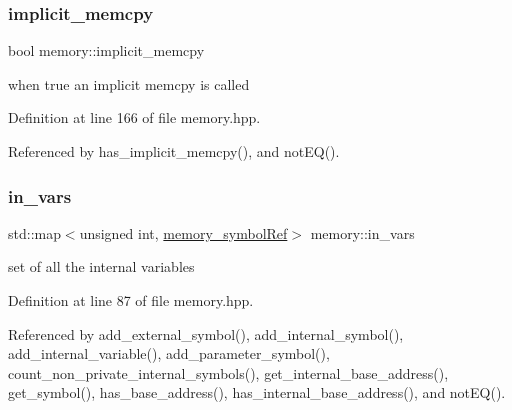 \mbox{\label{classmemory_a86949b9eb85aded9563911074a16f691}} 
\subsubsection{\texorpdfstring{implicit\+\_\+memcpy}{implicit\_memcpy}}
{\footnotesize\ttfamily bool memory\+::implicit\+\_\+memcpy\hspace{0.3cm}{\ttfamily [private]}}



when true an implicit memcpy is called 



Definition at line 166 of file memory.\+hpp.



Referenced by has\+\_\+implicit\+\_\+memcpy(), and not\+E\+Q().

\mbox{\label{classmemory_a7425f19fdc73130bccf232d8deef4006}} 
\subsubsection{\texorpdfstring{in\+\_\+vars}{in\_vars}}
{\footnotesize\ttfamily std\+::map$<$unsigned int, \hyperlink{memory__symbol_8hpp_af3608dbc27177447c2d777fa712cc82a}{memory\+\_\+symbol\+Ref}$>$ memory\+::in\+\_\+vars\hspace{0.3cm}{\ttfamily [private]}}



set of all the internal variables 



Definition at line 87 of file memory.\+hpp.



Referenced by add\+\_\+external\+\_\+symbol(), add\+\_\+internal\+\_\+symbol(), add\+\_\+internal\+\_\+variable(), add\+\_\+parameter\+\_\+symbol(), count\+\_\+non\+\_\+private\+\_\+internal\+\_\+symbols(), get\+\_\+internal\+\_\+base\+\_\+address(), get\+\_\+symbol(), has\+\_\+base\+\_\+address(), has\+\_\+internal\+\_\+base\+\_\+address(), and not\+E\+Q().

\mbox{\label{classmemory_a85abaa2319b6f0941e1448bb53c57958}} 
